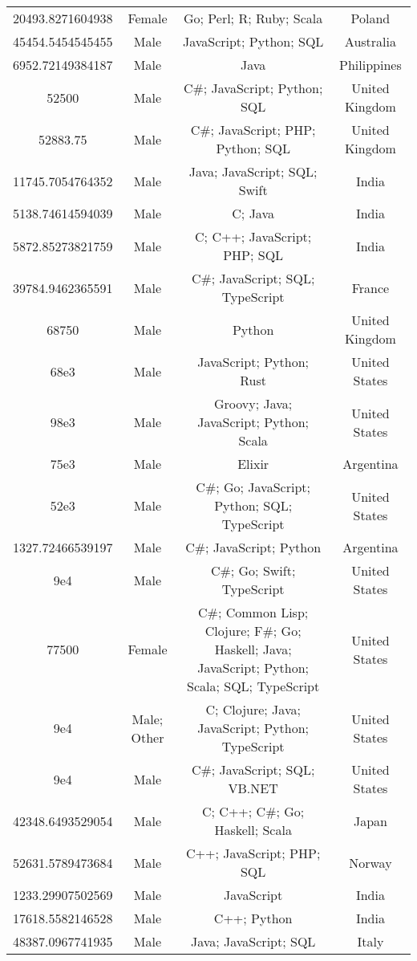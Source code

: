 \begin{center}
\begin{tabular}{ |c|c|c|c| }
20493.8271604938  &  Female  &  Go; Perl; R; Ruby; Scala  &  Poland  \\ 
45454.5454545455  &  Male  &  JavaScript; Python; SQL  &  Australia  \\ 
6952.72149384187  &  Male  &  Java  &  Philippines  \\ 
52500  &  Male  &  C\#; JavaScript; Python; SQL  &  United Kingdom  \\ 
52883.75  &  Male  &  C\#; JavaScript; PHP; Python; SQL  &  United Kingdom  \\ 
11745.7054764352  &  Male  &  Java; JavaScript; SQL; Swift  &  India  \\ 
5138.74614594039  &  Male  &  C; Java  &  India  \\ 
5872.85273821759  &  Male  &  C; C++; JavaScript; PHP; SQL  &  India  \\ 
39784.9462365591  &  Male  &  C\#; JavaScript; SQL; TypeScript  &  France  \\ 
68750  &  Male  &  Python  &  United Kingdom  \\ 
68e3  &  Male  &  JavaScript; Python; Rust  &  United States  \\ 
98e3  &  Male  &  Groovy; Java; JavaScript; Python; Scala  &  United States  \\ 
75e3  &  Male  &  Elixir  &  Argentina  \\ 
52e3  &  Male  &  C\#; Go; JavaScript; Python; SQL; TypeScript  &  United States  \\ 
1327.72466539197  &  Male  &  C\#; JavaScript; Python  &  Argentina  \\ 
9e4  &  Male  &  C\#; Go; Swift; TypeScript  &  United States  \\ 
77500  &  Female  &  C\#; Common Lisp; Clojure; F\#; Go; Haskell; Java; JavaScript; Python; Scala; SQL; TypeScript  &  United States  \\ 
9e4  &  Male; Other  &  C; Clojure; Java; JavaScript; Python; TypeScript  &  United States  \\ 
9e4  &  Male  &  C\#; JavaScript; SQL; VB.NET  &  United States  \\ 
42348.6493529054  &  Male  &  C; C++; C\#; Go; Haskell; Scala  &  Japan  \\ 
52631.5789473684  &  Male  &  C++; JavaScript; PHP; SQL  &  Norway  \\ 
1233.29907502569  &  Male  &  JavaScript  &  India  \\ 
17618.5582146528  &  Male  &  C++; Python  &  India  \\ 
48387.0967741935  &  Male  &  Java; JavaScript; SQL  &  Italy  \\ 

\end{tabular}
\end{center}

